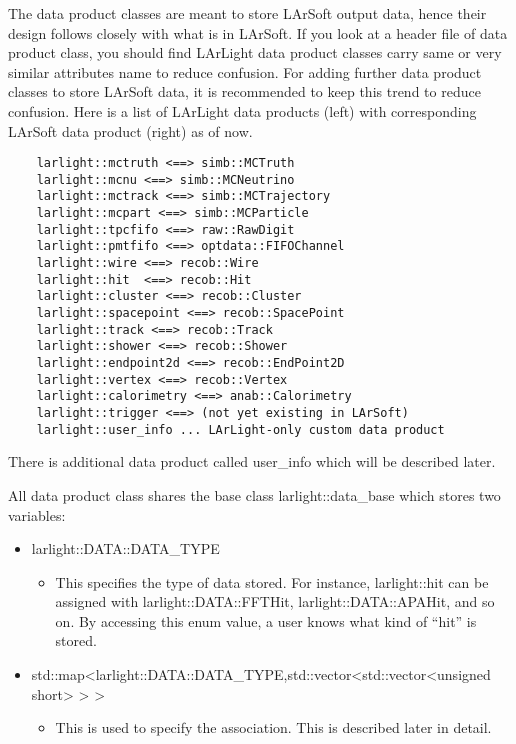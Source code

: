 The data product classes are meant to store LArSoft output data, hence their design follows closely with what is in LArSoft.
If you look at a header file of data product class, you should find LArLight data product classes carry same or very similar attributes name to reduce confusion.
For adding further data product classes to store LArSoft data, it is recommended to keep this trend to reduce confusion.
Here is a list of LArLight data products (left) with corresponding LArSoft data product (right) as of now.
\begin{lstlisting}
    larlight::mctruth <==> simb::MCTruth
    larlight::mcnu <==> simb::MCNeutrino
    larlight::mctrack <==> simb::MCTrajectory
    larlight::mcpart <==> simb::MCParticle
    larlight::tpcfifo <==> raw::RawDigit
    larlight::pmtfifo <==> optdata::FIFOChannel
    larlight::wire <==> recob::Wire
    larlight::hit  <==> recob::Hit
    larlight::cluster <==> recob::Cluster
    larlight::spacepoint <==> recob::SpacePoint
    larlight::track <==> recob::Track
    larlight::shower <==> recob::Shower
    larlight::endpoint2d <==> recob::EndPoint2D
    larlight::vertex <==> recob::Vertex
    larlight::calorimetry <==> anab::Calorimetry
    larlight::trigger <==> (not yet existing in LArSoft)
    larlight::user_info ... LArLight-only custom data product
\end{lstlisting}
There is additional data product called {\ttfamily user\_info} which will be described later.

All data product class shares the base class {\ttfamily larlight::data\_base} which stores two variables:
\begin{itemize}
\item {\ttfamily larlight::DATA::DATA\_TYPE}
  \begin{itemize}
    \item[] This \enum specifies the type of data stored. For instance, {\ttfamily larlight::hit} can be assigned with {\ttfamily larlight::DATA::FFTHit}, {\ttfamily larlight::DATA::APAHit}, and so on. By accessing this enum value, a user knows what kind of ``hit'' is stored.
  \end{itemize}
\item {\ttfamily std::map<larlight::DATA::DATA\_TYPE,std::vector<std::vector<unsigned short> > >}
  \begin{itemize}
    \item[] This is used to specify the association. This is described later in detail.
  \end{itemize}
\end{itemize}


